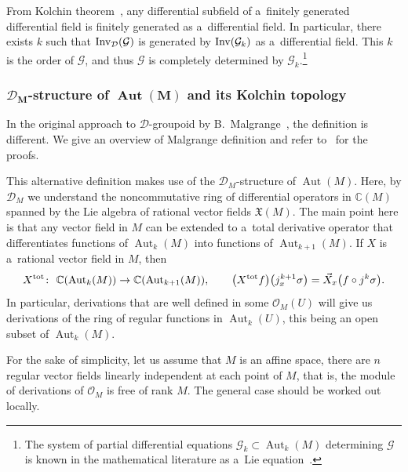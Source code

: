 \documentclass[10pt,a4paper]{amsart}
\numberwithin{equation}{section}
\theoremstyle{definition}
\begin{document}
{From Kolchin theorem~\cite{kolchin}, any differential subfield of a~finitely generated differential field is finitely generated as a~differential field. In particular, there exists $k$ such that ${\rm Inv}_{\mathcal D}(\mathcal G)$ is generated by ${\rm Inv}(\mathcal G_k)$ as a~differential field}. This $k$ is the order of $\mathcal G$, and thus $\mathcal G$ is completely determined by $\mathcal G_{k}$.\footnote{The system of partial differential equations $\mathcal G_k\subset \operatorname{Aut}_k(M)$ determining $\mathcal G$ is known in the mathematical literature as a~Lie equation~\cite{kumpera1972lie,munoz2000integrability}.}

\subsubsection[D\_M-structure of Aut(M) and its Kolchin topology]{$\boldsymbol{\mathcal D_M}$-structure of $\boldsymbol{\operatorname{Aut}(M)}$ and its Kolchin topology}

In the original approach to $\mathcal D$-groupoid by B.~Malgrange~\cite{malgrange2001groupoide}, the definition is different. We give an overview of Malgrange definition and refer to~\cite{davy} for the proofs.

This alternative definition makes use of the $\mathcal D_M$-structure of $\operatorname{Aut}(M)$. Here, by $\mathcal D_M$ we understand the noncommutative ring of differential operators in $\mathbb C(M)$ spanned by the Lie algebra of rational vector fields $\mathfrak X(M)$. The main point here is that any vector field in $M$ can be extended to a~total derivative operator that differentiates functions of $\operatorname{Aut}_k(M)$ into functions of $\operatorname{Aut}_{k+1}(M)$. If $X$ is a~rational vector field in $M$, then
\[X^{\rm tot}\colon\ \mathbb C(\operatorname{Aut}_k(M))\to \mathbb C(\operatorname{Aut}_{k+1}(M)),
 \qquad \bigl(X^{\rm tot}f\bigr)\bigl(j_x^{k+1}\sigma\bigr) = \vec X_x\bigl(f\circ j^k\sigma\bigr).\]
In particular, derivations that are well defined in some $\mathcal O_M(U)$ will give us derivations of the ring of regular functions in $\operatorname{Aut}_k(U)$, this being an open subset of $\operatorname{Aut}_k(M)$.

For the sake of simplicity, let us assume that $M$ is an affine space, there are $n$ regular vector fields linearly independent at each point of $M$, that is, the module of derivations of $\mathcal O_M$ is free of rank $M$. The general case should be worked out locally.
\end{document}
